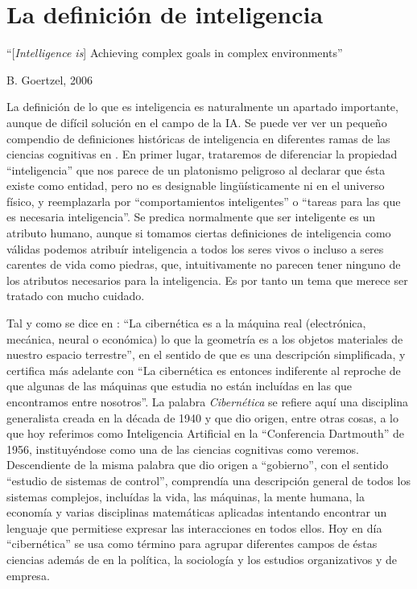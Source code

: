 \documentclass[12pt]{memoir}
\begin{document}
\chapter{La definición de inteligencia}

\epigraph{``[\textit{Intelligence is}] Achieving complex goals in complex environments''}{B. Goertzel, 2006}

La definición de lo que es inteligencia es naturalmente un apartado importante, aunque de difícil solución en el campo de la IA. Se puede ver ver un pequeño compendio de definiciones históricas de inteligencia en diferentes ramas de las ciencias cognitivas en \cite{intDefs}. En primer lugar, trataremos de diferenciar la propiedad ``inteligencia'' que nos parece de un platonismo peligroso al declarar que ésta existe como entidad, pero no es designable lingüísticamente ni en el universo físico, y reemplazarla por ``comportamientos inteligentes'' o ``tareas para las que es necesaria inteligencia''. Se predica normalmente que ser inteligente es un atributo humano, aunque si tomamos ciertas definiciones de inteligencia como válidas podemos atribuír inteligencia a todos los seres vivos o incluso a seres carentes de vida como piedras, que, intuitivamente no parecen tener ninguno de los atributos necesarios para la inteligencia. Es por tanto un tema que merece ser tratado con mucho cuidado.

Tal y como se dice en \cite{ciberneticsAshby}: ``La cibernética es a la máquina real (electrónica, mecánica, neural o económica) lo que la geometría es a los objetos materiales de nuestro espacio terrestre'', en el sentido de que es una descripción simplificada, y certifica más adelante con ``La cibernética es entonces indiferente al reproche de que algunas de las máquinas que estudia no están incluídas en las que encontramos entre nosotros''. La palabra \textit{Cibernética} se refiere aquí una disciplina generalista creada en la década de 1940 y que dio origen, entre otras cosas, a lo que hoy referimos como Inteligencia Artificial en la ``Conferencia Dartmouth'' de 1956, instituyéndose como una de las ciencias cognitivas como veremos. Descendiente de la misma palabra que dio origen a ``gobierno'', con el sentido ``estudio de sistemas de control'', comprendía una descripción general de todos los sistemas complejos, incluídas la vida, las máquinas, la mente humana, la economía y varias disciplinas matemáticas aplicadas intentando encontrar un lenguaje que permitiese expresar las interacciones en todos ellos. Hoy en día ``cibernética'' se usa como término para agrupar diferentes campos de éstas ciencias además de en la política, la sociología y los estudios organizativos y de empresa.
\end{document}
